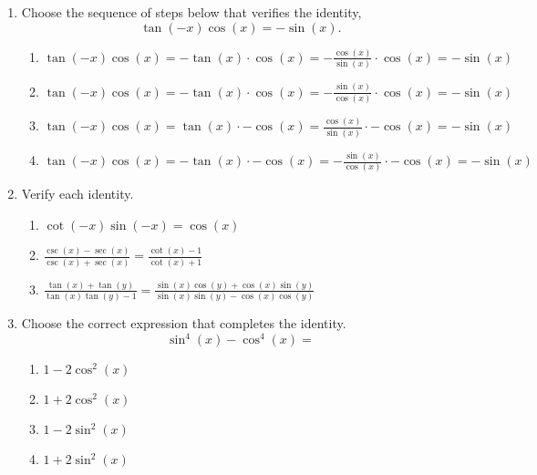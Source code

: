 \begin{enumerate}

\item Choose the sequence of steps below that verifies the identity,
  $$\tan(-x)\cos(x)=-\sin(x).$$
\begin{enumerate}
\item $\displaystyle \tan(-x)\cos(x)=-\tan(x)\cdot \cos(x)=-\frac{\cos(x)}{\sin(x)}\cdot \cos(x)=-\sin(x)$ \\ [1em]
\item $\displaystyle \tan(-x)\cos(x)=-\tan(x)\cdot \cos(x)=-\frac{\sin(x)}{\cos(x)}\cdot \cos(x)=-\sin(x)$  \\ [1em]
\item $\displaystyle \tan(-x)\cos(x)=\tan(x)\cdot -\cos(x)=\frac{\cos(x)}{\sin(x)}\cdot -\cos(x)=-\sin(x)$  \\ [1em]
\item $\displaystyle \tan(-x)\cos(x)=-\tan(x)\cdot -\cos(x)=-\frac{\sin(x)}{\cos(x)}\cdot -\cos(x)=-\sin(x)$  \\ [1em]
\end{enumerate}

\vfill
 
\clearpage

\item Verify each identity.
\begin{enumerate}

\item $\cot(-x)\sin(-x)=\cos(x)$

  \vfill

  
\item $\displaystyle \frac{\csc(x)-\sec(x)}{\csc(x)+\sec(x)}=\frac{\cot(x)-1}{\cot(x)+1}$

  \vfill
  \vfill

  \clearpage


\item $\displaystyle \frac{\tan(x)+\tan(y)}{\tan(x)\tan(y)-1}=\frac{\sin(x)\cos(y)+\cos(x)\sin(y)}{\sin(x)\sin(y)-\cos(x)\cos(y)}$


\vfill

\end{enumerate}



\clearpage

\item Choose the correct expression that completes the identity.
$$\sin^4(x)-\cos^4(x)=$$
\begin{enumerate}
\item $1-2\cos^2(x)$
\item $1+2\cos^2(x)$
\item $1-2\sin^2(x)$
\item $1+2\sin^2(x)$
\end{enumerate}
\vfill


\end{enumerate}
